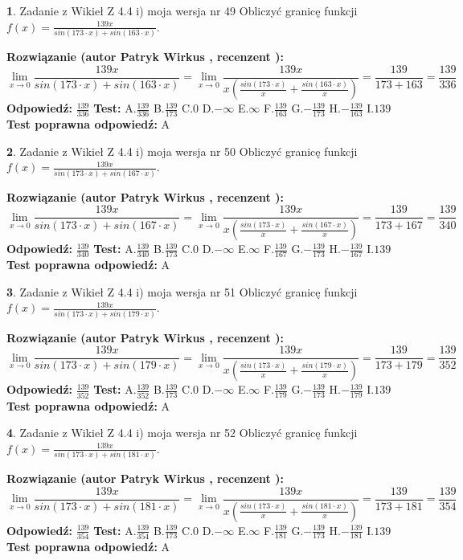 \documentclass[12pt, a4paper]{article}
\theoremstyle{definition} %
\newtheorem{zad}{}
\newcommand{\zadStart}[1]{\begin{zad}#1\newline}
\newcommand{\zadStop}{\end{zad}}
\newcommand{\rozwStart}[2]{\noindent \textbf{Rozwiązanie (autor #1 , recenzent #2): }\newline}
\newcommand{\rozwStop}{\newline}
\newcommand{\odpStart}{\noindent \textbf{Odpowiedź:}\newline}
\newcommand{\odpStop}{\newline}
\newcommand{\testStart}{\noindent \textbf{Test:}\newline}
\newcommand{\testStop}{\newline}
\newcommand{\kluczStart}{\noindent \textbf{Test poprawna odpowiedź:}\newline}
\newcommand{\kluczStop}{\newline}
\begin{document}
\zadStart{Zadanie z Wikieł Z 4.4 i) moja wersja nr 49}
Obliczyć granicę funkcji $f(x)=\frac{139x}{sin(173\cdot x) +sin(163\cdot x)}$.
\zadStop
\rozwStart{Patryk Wirkus}{}
$$\lim\limits_{x\to 0}\frac{139x}{sin(173\cdot x) +sin(163\cdot x)}=\lim\limits_{x\to 0}\frac{139x}{x(\frac{sin(173\cdot x)}{x}+\frac{sin(163\cdot x)}{x})}=\frac{139}{173+163} = \frac{139}{336}$$
\rozwStop
\odpStart
$\frac{139}{336}$
\odpStop
\testStart
A.$\frac{139}{336}$
B.$\frac{139}{173}$
C.$0$
D.$-\infty$
E.$\infty$
F.$\frac{139}{163}$
G.$-\frac{139}{173}$
H.$-\frac{139}{163}$
I.$139$
\testStop
\kluczStart
A
\kluczStop



\zadStart{Zadanie z Wikieł Z 4.4 i) moja wersja nr 50}
Obliczyć granicę funkcji $f(x)=\frac{139x}{sin(173\cdot x) +sin(167\cdot x)}$.
\zadStop
\rozwStart{Patryk Wirkus}{}
$$\lim\limits_{x\to 0}\frac{139x}{sin(173\cdot x) +sin(167\cdot x)}=\lim\limits_{x\to 0}\frac{139x}{x(\frac{sin(173\cdot x)}{x}+\frac{sin(167\cdot x)}{x})}=\frac{139}{173+167} = \frac{139}{340}$$
\rozwStop
\odpStart
$\frac{139}{340}$
\odpStop
\testStart
A.$\frac{139}{340}$
B.$\frac{139}{173}$
C.$0$
D.$-\infty$
E.$\infty$
F.$\frac{139}{167}$
G.$-\frac{139}{173}$
H.$-\frac{139}{167}$
I.$139$
\testStop
\kluczStart
A
\kluczStop



\zadStart{Zadanie z Wikieł Z 4.4 i) moja wersja nr 51}
Obliczyć granicę funkcji $f(x)=\frac{139x}{sin(173\cdot x) +sin(179\cdot x)}$.
\zadStop
\rozwStart{Patryk Wirkus}{}
$$\lim\limits_{x\to 0}\frac{139x}{sin(173\cdot x) +sin(179\cdot x)}=\lim\limits_{x\to 0}\frac{139x}{x(\frac{sin(173\cdot x)}{x}+\frac{sin(179\cdot x)}{x})}=\frac{139}{173+179} = \frac{139}{352}$$
\rozwStop
\odpStart
$\frac{139}{352}$
\odpStop
\testStart
A.$\frac{139}{352}$
B.$\frac{139}{173}$
C.$0$
D.$-\infty$
E.$\infty$
F.$\frac{139}{179}$
G.$-\frac{139}{173}$
H.$-\frac{139}{179}$
I.$139$
\testStop
\kluczStart
A
\kluczStop



\zadStart{Zadanie z Wikieł Z 4.4 i) moja wersja nr 52}
Obliczyć granicę funkcji $f(x)=\frac{139x}{sin(173\cdot x) +sin(181\cdot x)}$.
\zadStop
\rozwStart{Patryk Wirkus}{}
$$\lim\limits_{x\to 0}\frac{139x}{sin(173\cdot x) +sin(181\cdot x)}=\lim\limits_{x\to 0}\frac{139x}{x(\frac{sin(173\cdot x)}{x}+\frac{sin(181\cdot x)}{x})}=\frac{139}{173+181} = \frac{139}{354}$$
\rozwStop
\odpStart
$\frac{139}{354}$
\odpStop
\testStart
A.$\frac{139}{354}$
B.$\frac{139}{173}$
C.$0$
D.$-\infty$
E.$\infty$
F.$\frac{139}{181}$
G.$-\frac{139}{173}$
H.$-\frac{139}{181}$
I.$139$
\testStop
\kluczStart
A
\kluczStop
\end{document}
